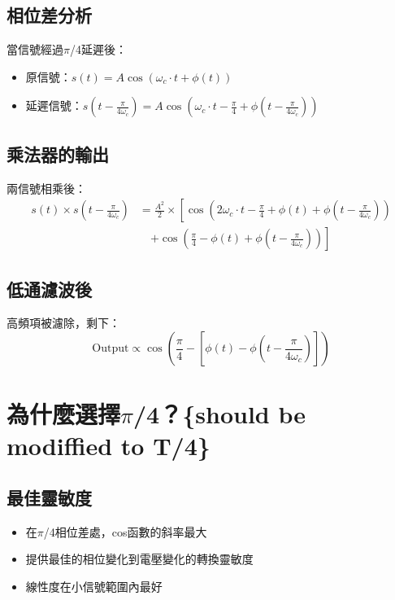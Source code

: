 \documentclass{article}
\begin{document}
\subsection{相位差分析}
當信號經過$\pi$/4延遲後：
\begin{itemize}
    \item 原信號：$s(t) = A \cos(\omega_c \cdot t + \phi(t))$
    \item 延遲信號：$s\left(t - \frac{\pi}{4\omega_c}\right) = A \cos\left(\omega_c \cdot t - \frac{\pi}{4} + \phi\left(t - \frac{\pi}{4\omega_c}\right)\right)$
\end{itemize}

\subsection{乘法器的輸出}
兩信號相乘後：
\begin{align}
s(t) \times s\left(t - \frac{\pi}{4\omega_c}\right) &= \frac{A^2}{2} \times \left[\cos\left(2\omega_c \cdot t - \frac{\pi}{4} + \phi(t) + \phi\left(t - \frac{\pi}{4\omega_c}\right)\right)\right. \nonumber \\
&\quad \left.+ \cos\left(\frac{\pi}{4} - \phi(t) + \phi\left(t - \frac{\pi}{4\omega_c}\right)\right)\right]
\end{align}

\subsection{低通濾波後}
高頻項被濾除，剩下：
\begin{equation}
\text{Output} \propto \cos\left(\frac{\pi}{4} - \left[\phi(t) - \phi\left(t - \frac{\pi}{4\omega_c}\right)\right]\right)
\end{equation}

\section{為什麼選擇$\pi$/4？\{should be modiffied to T/4\}}

\subsection{最佳靈敏度}
\begin{itemize}
    \item 在$\pi$/4相位差處，cos函數的斜率最大
    \item 提供最佳的相位變化到電壓變化的轉換靈敏度
    \item 線性度在小信號範圍內最好
\end{itemize}
\end{document}

